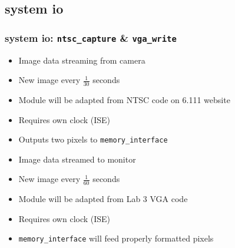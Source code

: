 \documentclass{beamer}
\begin{document}
\subsection{system io}
\begin{frame}
	\frametitle{system io: {\tt ntsc\_capture} \& {\tt vga\_write}}
		\begin{block}
			\begin{itemize}
				\item<2-> Image data streaming from camera
				\item<3-> New image every \(\frac{1}{30}\) seconds
				\item<4-> Module will be adapted from NTSC code on 6.111 website
				\item<5-> Requires own clock (ISE)
				\item<6-> Outputs two pixels to {\tt memory\_interface}
			\end{itemize}
		\end{block}

		\begin{block}
		\only<7->{{\tt vga\_write}}
			\begin{itemize}
				\item<8-> Image data streamed to monitor
				\item<9-> New image every \(\frac{1}{60}\) seconds
				\item<10-> Module will be adapted from Lab 3 VGA code
				\item<11-> Requires own clock (ISE)
				\item<12-> {\tt memory\_interface} will feed properly formatted pixels
			\end{itemize}
		\end{block}
\end{frame}

\end{document}
